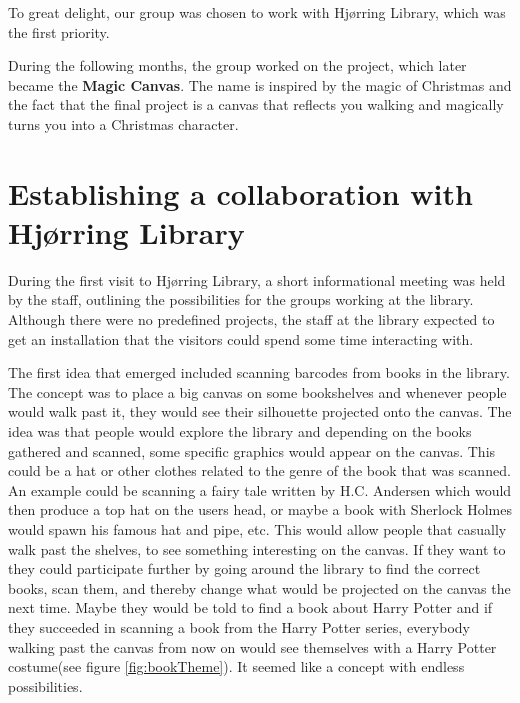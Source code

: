 To great delight, our group was chosen to work with Hj{\o}rring Library, which was the first priority.

During the following months, the group worked on the project, which later became the \textbf{Magic Canvas}. The name is inspired by the magic of Christmas and the fact that the final project is a canvas that reflects you walking and magically turns you into a Christmas character.

\section{Establishing a collaboration with Hj{\o}rring Library}


During the first visit to Hj{\o}rring Library, a short informational meeting was held by the staff, outlining the possibilities for the groups working at the library. Although there were no predefined projects, the staff at the library expected to get an installation that the visitors could spend some time interacting with.

The first idea that emerged included scanning barcodes from books in the library. The concept was to place a big canvas on some bookshelves and whenever people would walk past it, they would see their silhouette projected onto the canvas. The idea was that people would explore the library and depending on the books gathered and scanned, some specific graphics would appear on the canvas. This could be a hat or other clothes related to the genre of the book that was scanned. An example could be scanning a fairy tale written by H.C. Andersen which would then produce a top hat on the users head, or maybe a book with Sherlock Holmes would spawn his famous hat and pipe, etc. This would allow people that casually walk past the shelves, to see something interesting on the canvas. If they want to they could participate further by going around the library to find the correct books, scan them, and thereby change what would be projected on the canvas the next time. Maybe they would be told to find a book about Harry Potter and if they succeeded in scanning a book from the Harry Potter series, everybody walking past the canvas from now on would see themselves with a Harry Potter costume(see figure \ref{fig:bookTheme}). It seemed like a concept with endless possibilities.

